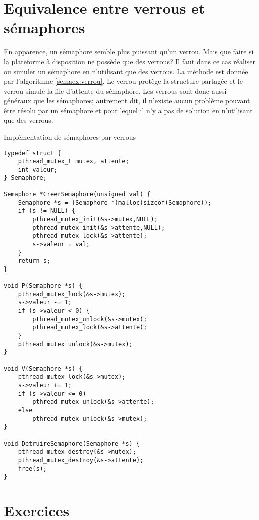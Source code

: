 \section{Equivalence entre verrous et sémaphores}
En apparence, un sémaphore semble plus puissant qu'un verrou. Mais que faire si la plateforme à disposition ne possède que des verrous? Il faut dans ce cas réaliser ou simuler un sémaphore en n'utilisant que des verrous. La méthode est donnée par l'algorithme \ref{semaex:verrou}. Le verrou  protège la structure partagée  et le verrou  simule la file d'attente du sémaphore.
Les verrous sont donc aussi généraux que les sémaphores; autrement dit, il n'existe aucun problème pouvant être résolu par un sémaphore et pour lequel il n'y a pas de solution en n'utilisant que des verrous.
\begin{algorithm}
\caption{Implémentation de sémaphores par verrous}\label{semaex:verrou}
\lstset{language=C++}
\begin{lstlisting}
typedef struct {
    pthread_mutex_t mutex, attente;
    int valeur;
} Semaphore;

Semaphore *CreerSemaphore(unsigned val) {
    Semaphore *s = (Semaphore *)malloc(sizeof(Semaphore));
    if (s != NULL) {
        pthread_mutex_init(&s->mutex,NULL);
        pthread_mutex_init(&s->attente,NULL);
        pthread_mutex_lock(&s->attente);
        s->valeur = val;
    }
    return s;
}

void P(Semaphore *s) {
    pthread_mutex_lock(&s->mutex);
    s->valeur -= 1;
    if (s->valeur < 0) {
        pthread_mutex_unlock(&s->mutex);
        pthread_mutex_lock(&s->attente);
    }
    pthread_mutex_unlock(&s->mutex);
}

void V(Semaphore *s) {
    pthread_mutex_lock(&s->mutex);
    s->valeur += 1;
    if (s->valeur <= 0)
        pthread_mutex_unlock(&s->attente);
    else
        pthread_mutex_unlock(&s->mutex);
}

void DetruireSemaphore(Semaphore *s) {
    pthread_mutex_destroy(&s->mutex);
    pthread_mutex_destroy(&s->attente);
    free(s);
}
\end{lstlisting}
\end{algorithm}



\section{Exercices}

